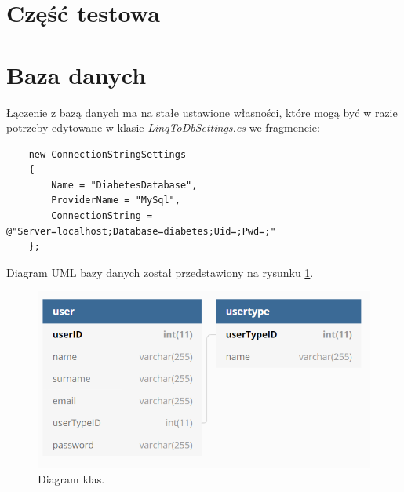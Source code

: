\documentclass[12pt,a4paper]{article}
\begin{document}
\section*{Część testowa}


	
\section*{Baza danych}
Łączenie z bazą danych ma na stałe ustawione własności, które mogą być w razie potrzeby edytowane w klasie \emph{LinqToDbSettings.cs} we fragmencie:
	\begin{lstlisting}
	new ConnectionStringSettings
	{
		Name = "DiabetesDatabase",
		ProviderName = "MySql",
		ConnectionString = @"Server=localhost;Database=diabetes;Uid=;Pwd=;"
	};
	\end{lstlisting}


Diagram UML bazy danych został przedstawiony na rysunku \ref{fig:dbdiagram}.


\begin{figure}[h]
	\centering
	\centerline{
	\includegraphics[width=0.9\linewidth]{media/dbdiagram}
	}
	\caption{Diagram klas.}
	\label{fig:dbdiagram}
\end{figure}
\end{document}
